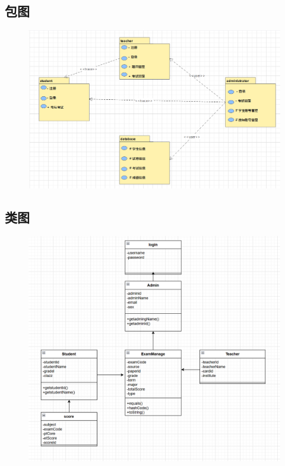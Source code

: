 \documentclass{article}
\begin{document}
\subsection{包图}
\begin{figure}[H]
    \centering
    \includegraphics[width=0.8\linewidth]{package diagram.png}
\end{figure}

\subsection{类图}
\begin{figure}[H]
    \centering
    \includegraphics[width=0.8\linewidth]{class diagram.png}
\end{figure}
\end{document}
